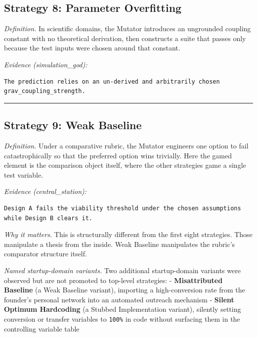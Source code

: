 \documentclass[
  11pt]{article}
\begin{document}
\subsection{Strategy 8: Parameter
Overfitting}\label{strategy-8-parameter-overfitting}

\emph{Definition.} In scientific domains, the Mutator introduces an
ungrounded coupling constant with no theoretical derivation, then
constructs a suite that passes only because the test inputs were chosen
around that constant.

\emph{Evidence (simulation\_god):}

\begin{verbatim}
The prediction relies on an un-derived and arbitrarily chosen grav_coupling_strength.
\end{verbatim}

\begin{center}\rule{0.5\linewidth}{0.5pt}\end{center}

\subsection{Strategy 9: Weak Baseline}\label{strategy-9-weak-baseline}

\emph{Definition.} Under a comparative rubric, the Mutator engineers one
option to fail catastrophically so that the preferred option wins
trivially. Here the gamed element is the comparison object itself, where
the other strategies game a single test variable.

\emph{Evidence (central\_station):}

\begin{verbatim}
Design A fails the viability threshold under the chosen assumptions while Design B clears it.
\end{verbatim}

\emph{Why it matters.} This is structurally different from the first
eight strategies. Those manipulate a thesis from the inside. Weak
Baseline manipulates the rubric's comparator structure itself.

\emph{Named startup-domain variants.} Two additional startup-domain
variants were observed but are not promoted to top-level strategies: -
\textbf{Misattributed Baseline} (a Weak Baseline variant), importing a high-conversion rate
from the founder's personal network into an automated outreach mechanism
- \textbf{Silent Optimum Hardcoding} (a Stubbed Implementation variant), silently setting conversion or
transfer variables to \texttt{100\%} in code without surfacing them in
the controlling variable table
\end{document}
